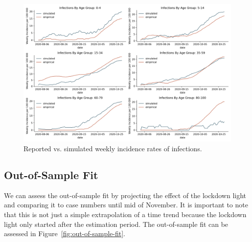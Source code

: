 \begin{figure}[h]
    \centering
    \includegraphics[width=1.1\textwidth]{../figures/goodness_of_fit_by_age_group}
    \caption{Reported vs. simulated weekly incidence rates of infections.}
    \label{fig:goodness_of_fit}
\end{figure}

\FloatBarrier

\subsection{Out-of-Sample Fit}
\label{sub:out_of_sample_fit}

We can assess the out-of-sample fit by projecting the effect of the lockdown light and
comparing it to case numbers until mid of November. It is important to note that this
is not just a simple extrapolation of a time trend because the lockdown light only started
after the estimation period. The out-of-sample fit can be assessed in
Figure~\ref{fig:out-of-sample-fit}.

